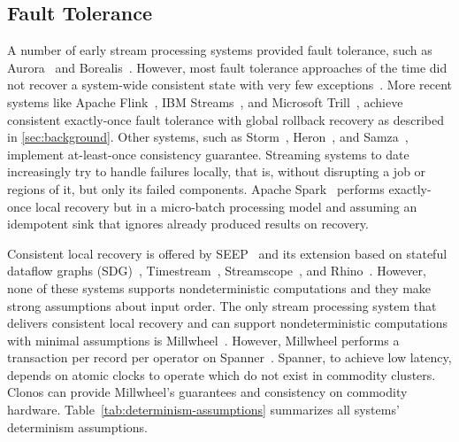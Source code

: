 \documentclass[sigconf]{acmart}
\begin{document}
\subsection{Fault Tolerance}
A number of early stream processing systems provided fault tolerance, such as Aurora~\cite{CherniackBB03} and Borealis~\cite{BalazinskaBM05}. However, most fault tolerance approaches of the time did not recover a system-wide consistent state  with very few exceptions~\cite{Shah2004highly}.
More recent systems like Apache Flink~\cite{CarboneKE15}, IBM Streams~\cite{SilvaZD16}, and Microsoft Trill~\cite{ChandramouliGB15}, achieve consistent exactly-once fault tolerance with global rollback recovery as described in \autoref{sec:background}. Other systems, such as Storm~\cite{ToshniwalT14}, Heron~\cite{KulkarniBF15}, and Samza~\cite{NoghabiPP17}, implement at-least-once consistency guarantee.
Streaming systems to date increasingly try to handle failures locally, that is, without disrupting a job or regions of it, but only its failed components.
Apache Spark~\cite{ArmbrustDT18} performs exactly-once local recovery but in a micro-batch processing model and assuming an idempotent sink that ignores already produced results on recovery.


Consistent local recovery is offered by SEEP~\cite{FernandezMK13} and its extension based on stateful dataflow graphs (SDG)~\cite{FernandezMK14}, Timestream~\cite{QianHS13}, Streamscope~\cite{LinHZ16}, and Rhino~\cite{delmonte2020rhino}. However, none of these systems supports nondeterministic computations and they make strong assumptions about input order. 
The only stream processing system that delivers consistent local recovery and can support nondeterministic computations with minimal assumptions is Millwheel~\cite{akidau2013millwheel}. However, Millwheel performs a transaction per record per operator on Spanner~\cite{spanner}. Spanner, to achieve low latency, depends on atomic clocks to operate which do not exist in commodity clusters. Clonos can provide Millwheel's guarantees and consistency on commodity hardware.
Table~\ref{tab:determinism-assumptions} summarizes all systems' determinism assumptions.


\end{document}
